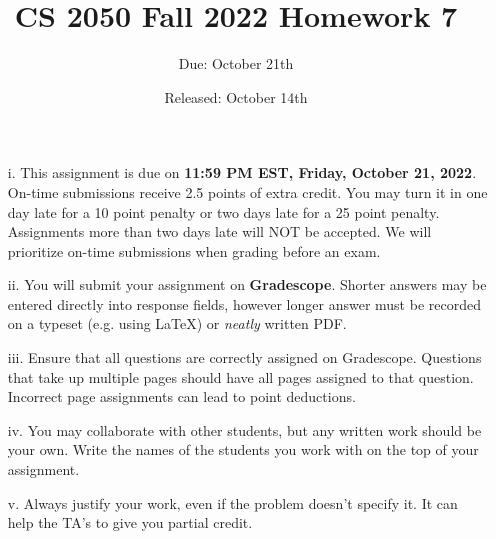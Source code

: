 \documentclass{article}
\title{CS 2050 Fall 2022 Homework 7}
\author{Due: October 21th}
\date{Released: October 14th}
\begin{document}
\maketitle

\begin{enumerate}
    \item[i.] This assignment is due on \textbf{11:59 PM EST, Friday, October 21, 2022}.  On-time submissions receive 2.5 points of extra credit. You may turn it in one day late for a 10 point penalty or two days late for a 25 point penalty. Assignments more than two days late will NOT be accepted.  We will prioritize on-time submissions when grading before an exam.
    \item[ii.] You will submit your assignment on \textbf{Gradescope}. Shorter answers may be entered directly into response fields, however longer answer must be recorded on a typeset (e.g. using \LaTeX) or \emph{neatly} written PDF.
    \item[iii.] Ensure that all questions are correctly assigned on Gradescope. Questions that take up multiple pages should have all pages assigned to that question. Incorrect page assignments can lead to point deductions.
    \item[iv.] You may collaborate with other students, but any written work should be your own. Write the names of the students you work with on the top of your assignment.
    \item[v.] Always justify your work, even if the problem doesn't specify it. It can help the TA's to give you partial credit.
\end{enumerate}
\end{document}
